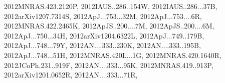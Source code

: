 \documentclass[12pt]{article}
\begin{document}
\begin{description}
{2012MNRAS.423.2120P,%
2012IAUS..286..154W,%
2012IAUS..286...37B,%
2012arXiv1207.7314S,%
2012ApJ...753...32M,%
2012ApJ...753....6R,%
2012MNRAS.422.2465K,%
2012ApJS..200....7M,%
2012ApJS..200....6M,%
2012ApJ...750...34H,%
2012arXiv1204.6322L,%
2012ApJ...749..179B,%
2012ApJ...748...79Y,%
2012AN....333..230K,%
2012AN....333..195B,%
2012ApJ...748...51H,%
2012MNRAS.420L...1G,%
2012MNRAS.420.1640R,%
2012JCoPh.231..919F,%
2012AN....333...95K,%
2012MNRAS.419..913P,%
2012arXiv1201.0652R,%
2012AN....333...71R,%
}
\end{description}
\end{document}
